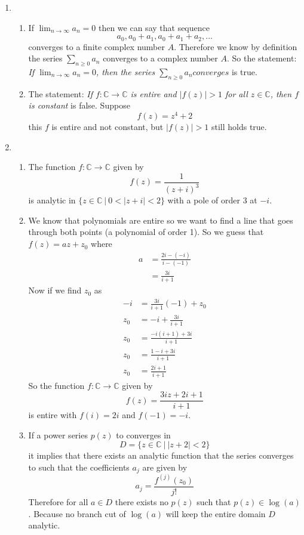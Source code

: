 \documentclass[11pt]{article}
\newcommand{\CC}{\mathbb{C}}
\begin{document}
\begin{enumerate}
\begin{enumerate}
\end{enumerate}

\item  
\begin{enumerate}
\item  
If $\lim_{n\rightarrow\infty}a_n = 0$ then we can say that sequence 
$$a_0,a_0+a_1,a_0+a_1+a_2,...$$
converges to a finite complex number $A$. Therefore we know by definition the series $\sum_{n\ge0}a_n$ converges to a complex number $A$. So the statement: \textit{If $\lim_{n\rightarrow\infty}a_n=0$, then the series $\sum_{n\ge0}a_n converges$} is true.

\item  
The statement: \textit{If $f:\CC\rightarrow\CC$ is entire and $|f(z)|>1$ for all $z\in\CC$, then $f$ is constant} is false. Suppose 
$$f(z) = z^4+2$$
this $f$ is entire and not constant, but $|f(z)|>1$ still holds true.
\end{enumerate}

\item  
\begin{enumerate}
\item  
The function $f:\CC\rightarrow\CC$ given by
$$f(z) = \frac{1}{(z+i)^3}$$
is analytic in $\{z\in\CC\ |\ 0<|z+i|<2\}$ with a pole of order 3 at $-i$.

\item  
We know that polynomials are entire so we want to find a line that goes through both points (a polynomial of order 1). So we guess that $f(z) = az+z_0$ where 
\begin{align*}
a &= \frac{2i-(-i)}{i-(-1)}\\
&= \frac{3i}{i+1}
\end{align*}
Now if we find $z_0$ as
\begin{align*}
-i &= \frac{3i}{i+1}(-1)+z_0\\
z_0 &= -i + \frac{3i}{i+1}\\
z_0 &= \frac{-i(i+1)+3i}{i+1}\\
z_0 &= \frac{1-i+3i}{i+1}\\
z_0 &= \frac{2i+1}{i+1}
\end{align*}
So the function $f:\CC\rightarrow\CC$ given by
$$f(z) = \frac{3iz+2i+1}{i+1}$$
is entire with $f(i) = 2i$ and $f(-1) = -i$.

\item  
If a power series $p(z)$ to converges in
$$D = \{z\in\CC\ |\ |z+2|<2\}$$
it implies that there exists an analytic function that the series converges to such that the coefficients $a_j$ are given by
$$a_j = \frac{f^{(j)}(z_0)}{j!}$$
Therefore for all $a\in D$ there exists no $p(z)$ such that $p(z)\in \log(a)$. Because no branch cut of $\log(a)$ will keep the entire domain $D$ analytic.


\end{enumerate}
\end{enumerate}
\end{document}

